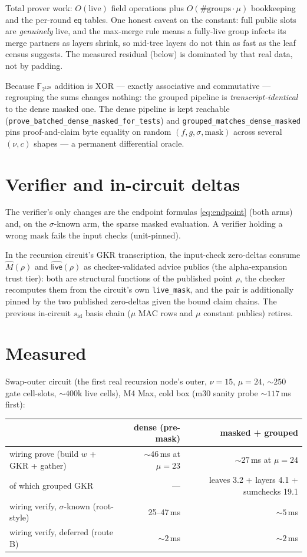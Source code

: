 \documentclass[11pt]{article}
\newcommand{\F}{\mathbb{F}}
\newcommand{\eq}{\mathsf{eq}}
\newcommand{\code}[1]{\texttt{#1}}
\newcommand{\sid}{s_{\mathrm{id}}}
\newcommand{\live}{\mathsf{live}}
\newcommand{\lv}{\widehat{\live}}
\newcommand{\Mh}{\widehat{M}}
\theoremstyle{definition}
\begin{document}
Total prover work: $O(\mathrm{live})$ field operations plus
$O(\#\mathrm{groups} \cdot \mu)$ bookkeeping and the per-round $\eq$
tables. One honest caveat on the constant: full public slots are
\emph{genuinely} live, and the max-merge rule means a fully-live group
infects its merge partners as layers shrink, so mid-tree layers do not
thin as fast as the leaf census suggests. The measured residual (below)
is dominated by that real data, not by padding.

Because $\F_{2^{128}}$ addition is XOR --- exactly associative and
commutative --- regrouping the sums changes nothing: the grouped
pipeline is \emph{transcript-identical} to the dense masked one. The
dense pipeline is kept reachable
(\code{prove\_batched\_dense\_masked\_for\_tests}) and
\code{grouped\_matches\_dense\_masked} pins proof-and-claim byte
equality on random $(f, g, \sigma, \mathrm{mask})$ across several
$(\nu, c)$ shapes --- a permanent differential oracle.

\section{Verifier and in-circuit deltas}

The verifier's only changes are the endpoint formulas
\eqref{eq:endpoint} (both arms) and, on the $\sigma$-known arm, the
sparse masked evaluation. A verifier holding a wrong mask fails the
input checks (unit-pinned).

In the recursion circuit's GKR transcription, the input-check zero-deltas
consume $\Mh(\rho)$ and $\lv(\rho)$ as checker-validated advice publics
(the alpha-expansion trust tier): both are structural functions of the
published point $\rho$, the checker recomputes them from the circuit's
own \code{live\_mask}, and the pair is additionally pinned by the two
published zero-deltas given the bound claim chains. The previous
in-circuit $\sid$ basis chain ($\mu$ MAC rows and $\mu$ constant
publics) retires.

\section{Measured}

Swap-outer circuit (the first real recursion node's outer,
$\nu = 15$, $\mu = 24$, ${\sim}250$ gate cell-slots, ${\sim}400$k live
cells), M4 Max, cold box (m30 sanity probe ${\sim}117$\,ms first):

\begin{center}
\begin{tabular}{lrr}
\toprule
 & dense (pre-mask) & masked + grouped \\
\midrule
wiring prove (build $w$ + GKR + gather) & ${\sim}46$\,ms at $\mu{=}23$ & ${\sim}27$\,ms at $\mu{=}24$ \\
\quad of which grouped GKR & --- & leaves 3.2 + layers 4.1 + sumchecks 19.1 \\
wiring verify, $\sigma$-known (root-style) & 25--47\,ms & ${\sim}5$\,ms \\
wiring verify, deferred (route B) & ${\sim}2$\,ms & ${\sim}2$\,ms \\
\bottomrule
\end{tabular}
\end{center}
\end{document}
